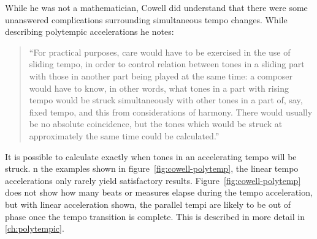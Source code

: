 While he was not a mathematician, Cowell did understand that there
were some unanswered complications surrounding simultaneous tempo
changes. While describing polytempic accelerations he notes:
\begin{quotation}
``For practical purposes, care would have to be exercised in the use of
sliding tempo, in order to control relation between tones in a sliding
part with those in another part being played at the same time: a
composer would have to know, in other words, what tones in a part with
rising tempo would be struck simultaneously with other tones in a part
of, say, fixed tempo, and this from considerations of harmony. There
would usually be no absolute coincidence, but the tones which would be
struck at approximately the same time could be calculated.''
\end{quotation}
It is possible to calculate exactly when tones in an accelerating
tempo will be struck. n the examples shown in
figure~\ref{fig:cowell-polytemp}, the linear tempo accelerations only
rarely yield satisfactory results. Figure~\ref{fig:cowell-polytemp}
does not show how many beats or measures elapse during the tempo
acceleration, but with linear acceleration shown, the parallel tempi
are likely to be out of phase once the tempo transition is
complete. This is described in more detail in \autoref{ch:polytempic}.

